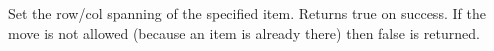 \label{wxgridbagsizersetitemspan}




Set the row/col spanning of the specified item. Returns true on
success.  If the move is not allowed (because an item is already there)
then false is returned.



